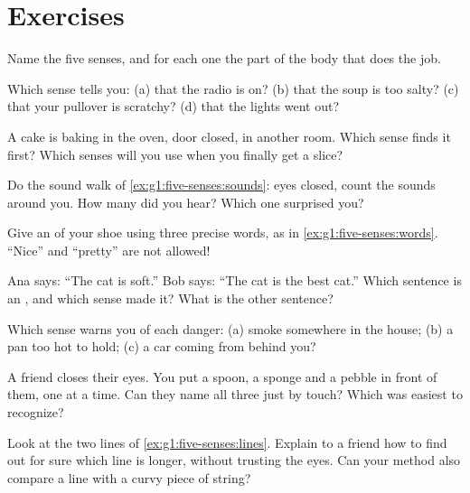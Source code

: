 \section{Exercises}

\begin{exercise}[$\star$]\label{exo:g1:five-senses:1}
Name the five senses, and for each one the part of the body that
does the job.
\end{exercise}

\begin{exercise}[$\star$]\label{exo:g1:five-senses:2}
Which sense tells you: (a) that the radio is on? (b) that the soup
is too salty? (c) that your pullover is scratchy? (d) that the
lights went out?
\end{exercise}

\begin{exercise}[$\star$]\label{exo:g1:five-senses:3}
A cake is baking in the oven, door closed, in another room. Which
sense finds it first? Which senses will you use when you finally
get a slice?
\end{exercise}

\begin{exercise}[$\star$]\label{exo:g1:five-senses:4}
Do the sound walk of \cref{ex:g1:five-senses:sounds}: eyes closed,
count the sounds around you. How many did you hear? Which one
surprised you?
\end{exercise}

\begin{exercise}[$\star$]\label{exo:g1:five-senses:5}
Give an  of your shoe using three precise words, as in
\cref{ex:g1:five-senses:words}. ``Nice'' and ``pretty'' are not
allowed!
\end{exercise}

\begin{exercise}[$\star$]\label{exo:g1:five-senses:6}
Ana says: ``The cat is soft.'' Bob says: ``The cat is the best cat.''
Which sentence is an , and which sense made it? What is
the other sentence?
\end{exercise}

\begin{exercise}[$\star$]\label{exo:g1:five-senses:7}
Which sense warns you of each danger: (a) smoke somewhere in the
house; (b) a pan too hot to hold; (c) a car coming from behind you?
\end{exercise}

\begin{exercise}[$\star$]\label{exo:g1:five-senses:8}
A friend closes their eyes. You put a spoon, a sponge and a pebble in
front of them, one at a time. Can they name all three just by touch?
Which was easiest to recognize?
\end{exercise}

\begin{exercise}[$\star\star$]\label{exo:g1:five-senses:9}
Look at the two lines of \cref{ex:g1:five-senses:lines}. Explain to a
friend how to find out for sure which line is longer, without
trusting the eyes. Can your method also compare a line with a curvy
piece of string?
\end{exercise}
